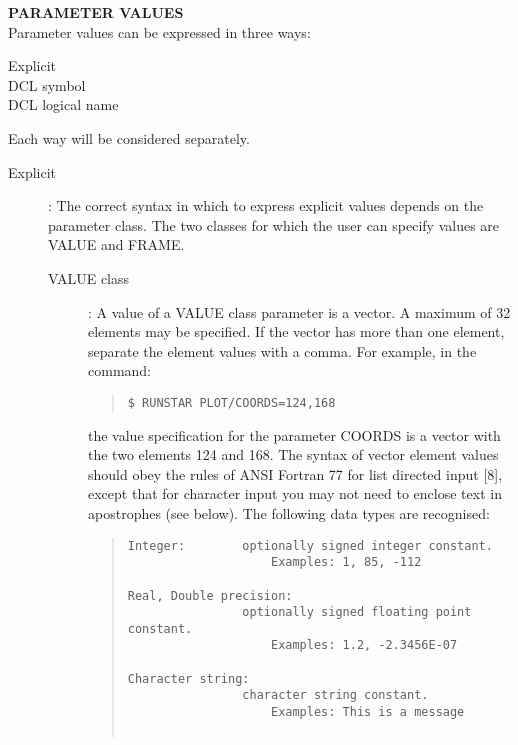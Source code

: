 \documentclass{article}
\begin{document}
\vspace{5mm}
{\bf PARAMETER VALUES}\\
Parameter values can be expressed in three ways:
\begin{description}
\item [Explicit]
\item [DCL symbol]
\item [DCL logical name]
\end{description}
Each way will be considered separately.
\begin{description}
\item [Explicit]:
The correct syntax in which to express explicit values depends on the parameter
class.
The two classes for which the user can specify values are VALUE and FRAME.
\begin{description}
\item [VALUE class]:
A value of a VALUE class parameter is a vector.
A maximum of 32 elements may be specified.
If the vector has more than one element, separate the element values with a
comma.
For example, in the command:
\begin{quote}
{\tt \$ RUNSTAR PLOT/COORDS=124,168}
\end{quote}
the value specification for the parameter COORDS is a vector with the two
elements 124 and 168.
The syntax of vector element values should obey the rules of ANSI Fortran 77 for
list directed input [8], except that for character input you may not need to
enclose text in apostrophes (see below).
The following data types are recognised:
\begin{quote}
\begin{verbatim}
Integer:        optionally signed integer constant.
                    Examples: 1, 85, -112

Real, Double precision:
                optionally signed floating point constant.
                    Examples: 1.2, -2.3456E-07

Character string:
                character string constant.
                    Examples: This is a message


\end{verbatim}
\end{quote}
\end{description}
\end{description}
\end{document}

